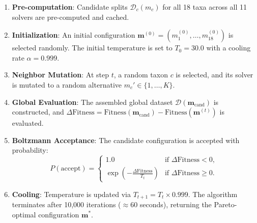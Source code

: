 \begin{enumerate}[label=\textbf{Step \arabic*:}, leftmargin=*]
\item \textbf{Pre-computation}: Candidate splits $\mathcal{D}_c(m_c)$ for all 18 taxa across all 11 solvers are pre-computed and cached.
\item \textbf{Initialization}: An initial configuration $\boldsymbol{m}^{(0)} = (m_1^{(0)}, \dots, m_{18}^{(0)})$ is selected randomly. The initial temperature is set to $T_0 = 30.0$ with a cooling rate $\alpha = 0.999$.
\item \textbf{Neighbor Mutation}: At step $t$, a random taxon $c$ is selected, and its solver is mutated to a random alternative $m_c' \in \{1, \dots, K\}$.
\item \textbf{Global Evaluation}: The assembled global dataset $\mathcal{D}(\boldsymbol{m}_{\text{cand}})$ is constructed, and $\Delta \mathrm{Fitness} = \mathrm{Fitness}(\boldsymbol{m}_{\text{cand}}) - \mathrm{Fitness}(\boldsymbol{m}^{(t)})$ is evaluated.
\item \textbf{Boltzmann Acceptance}: The candidate configuration is accepted with probability:
\begin{equation}
P(\text{accept}) = \begin{cases} 1.0 & \text{if } \Delta \mathrm{Fitness} < 0, \\ \exp\left(-\frac{\Delta \mathrm{Fitness}}{T_t}\right) & \text{if } \Delta \mathrm{Fitness} \ge 0. \end{cases}
\end{equation}
\item \textbf{Cooling}: Temperature is updated via $T_{t+1} = T_t \times 0.999$. The algorithm terminates after 10,000 iterations ($\approx 60$ seconds), returning the Pareto-optimal configuration $\boldsymbol{m}^*$.
\end{enumerate}
